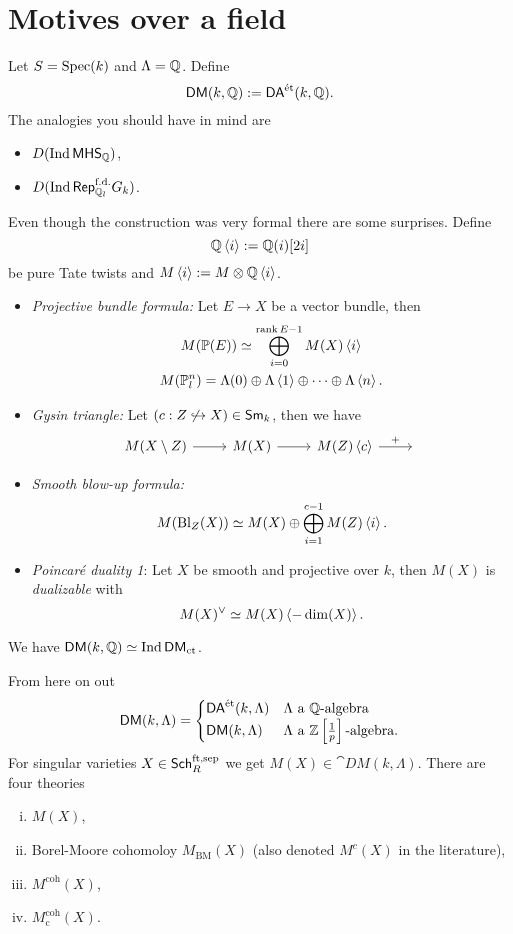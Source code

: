 \section{Motives over a field}
Let $S=\operatorname{Spec}(k)$ and $\Lambda=\mathbb Q$. Define
\[
\mathsf{DM}(k,\mathbb Q) := \mathsf{DA}^\text{\'et}(k,\mathbb Q).
\]
The analogies you should have in mind are
\begin{itemize}
\item $D(\operatorname{Ind} \mathsf{MHS}_{\mathbb Q})$,
\item $D(\operatorname{Ind} \mathsf{Rep}_{\mathbb Q_l}^{\text{f.d.}}G_k)$.
\end{itemize}
Even though the construction was very formal there are some surprises. Define
\[
\mathbb Q\left<i \right> := \mathbb Q(i)[2i]
\]
be pure Tate twists and $M\left<i \right>:= M\otimes \mathbb Q\left<i \right>$.
\begin{itemize}
\item \emph{Projective bundle formula:} Let $E\to X$ be a vector bundle, then
\begin{gather*}
M(\mathbb{P}(E)) \simeq \bigoplus_{i=0}^{\operatorname{rank} E-1}M(X)\left<i \right> \\
M(\mathbb{P}^{n}_l) = \Lambda(0)\oplus \Lambda\left<1 \right>\oplus \dots\oplus \Lambda\left<n \right>.
\end{gather*}
\item \emph{Gysin triangle:} Let $(c:Z\not\hookrightarrow X)\in \mathsf{Sm}_k$, then we have
\[
\begin{tikzcd}
M(X\setminus Z) \ar[r] & M(X) \ar[r] & M(Z)\left<c \right> \ar[r,"+"] & { }
\end{tikzcd}
\]
\item \emph{Smooth blow-up formula:}
\[
M(\operatorname{Bl}_Z(X)) \simeq M(X)\oplus \bigoplus_{i=1}^{c-1}M(Z)\left<i \right>.
\]
\item \emph{Poincar\'e duality 1}: Let $X$ be smooth and projective over $k$, then $M(X)$
is \emph{dualizable} with
\[
M(X)^{\vee}\simeq M(X)\left<-\dim(X) \right>.
\]
\end{itemize}
We have $\mathsf{DM}(k,\mathbb Q)\simeq \operatorname{Ind}\mathsf{DM}_{\text{ct}}$.

From here on out
\[
\mathsf{DM}(k,\Lambda) =
\begin{cases}
\mathsf{DA}^\text{\'et}(k,\Lambda) & \Lambda\text{ a }\mathbb Q\text{-algebra} \\
\mathsf{DM}(k,\Lambda) & \Lambda\text{ a }\mathbb Z\left[ \frac{1}{p} \right] \text{-algebra}.
\end{cases}
\]
For singular varieties $X\in \mathsf{Sch}_R^{\text{ft,sep}}$ we get $M(X)\in
\cat{DM}(k,\Lambda)$. There are four theories
\begin{enumerate}[(i)]
\item $M(X)$,
\item Borel-Moore cohomoloy $M_{\mathrm{BM}}(X)$ (also denoted $M^{c}(X)$ in the literature),
\item $M^{\text{coh}}(X)$,
\item $M_{\text{c}}^{\text{coh}}(X)$.
\end{enumerate}

